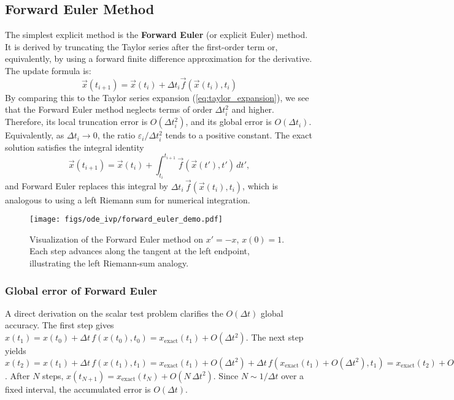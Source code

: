 \subsection{Forward Euler Method}
\label{subsec:ivp-forward-euler}
The simplest explicit method is the \textbf{Forward Euler} (or explicit Euler) method. It is derived by truncating the Taylor series after the first-order term or, equivalently, by using a forward finite difference approximation for the derivative. The update formula is:
\begin{equation}
    \vec{x}(t_{i+1}) = \vec{x}(t_i) + \Delta t_i \vec{f}(\vec{x}(t_i), t_i)
    \label{eq:forward_euler}
\end{equation}
By comparing this to the Taylor series expansion (\autoref{eq:taylor_expansion}), we see that the Forward Euler method neglects terms of order $\Delta t_i^2$ and higher. Therefore, its local truncation error is $O(\Delta t_i^2)$, and its global error is $O(\Delta t_i)$. Equivalently, as $\Delta t_i\to 0$, the ratio $\varepsilon_i/\Delta t_i^2$ tends to a positive constant. The exact solution satisfies the integral identity
\begin{equation}
    \vec{x}(t_{i+1}) = \vec{x}(t_i) + \int_{t_i}^{t_{i+1}} \vec{f}(\vec{x}(t'), t')\,dt',
\end{equation}
and Forward Euler replaces this integral by $\Delta t_i\,\vec{f}(\vec{x}(t_i), t_i)$, which is analogous to using a left Riemann sum for numerical integration.

\begin{figure}[h!]
    \centering
    \texttt{[image: figs/ode\_ivp/forward\_euler\_demo.pdf]}
    \caption{Visualization of the Forward Euler method on $x'=-x$, $x(0)=1$. Each step advances along the tangent at the left endpoint, illustrating the left Riemann-sum analogy.}
    \label{fig:forward-euler-viz}
\end{figure}

\subsubsection{Global error of Forward Euler}
A direct derivation on the scalar test problem clarifies the $O(\Delta t)$ global accuracy. The first step gives $x(t_1)=x(t_0)+\Delta t\,f(x(t_0),t_0)=x_{\text{exact}}(t_1)+O(\Delta t^2)$. The next step yields $x(t_2)=x(t_1)+\Delta t\,f(x(t_1),t_1)=x_{\text{exact}}(t_1)+O(\Delta t^2)+\Delta t\,f(x_{\text{exact}}(t_1)+O(\Delta t^2),t_1)=x_{\text{exact}}(t_2)+O(2\,\Delta t^2)$. After $N$ steps, $x(t_{N+1})=x_{\text{exact}}(t_N)+O(N\,\Delta t^2)$. Since $N\sim 1/\Delta t$ over a fixed interval, the accumulated error is $O(\Delta t)$.

